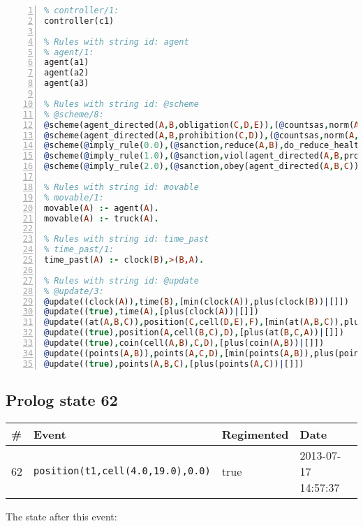 \documentclass[11pt]{article}\usepackage[utf8]{inputenc}\usepackage{geometry}
\begin{document}
\begin{lstlisting}[language=Prolog, numbers=left]
% Rules with string id: controller
% controller/1:
controller(c1)

% Rules with string id: agent
% agent/1:
agent(a1)
agent(a2)
agent(a3)

% Rules with string id: @scheme
% @scheme/8:
@scheme(agent_directed(A,B,obligation(C,D,E)),(@countsas,norm(A,B,F,obligation(C,D,E)),F),false,(listTrue(C)),(time_past(D)),false,[plus(viol(agent_directed(A,B,obligation(C,D,E))))|[]],[plus(obey(agent_directed(A,B,obligation(C,D,E))))|[]])
@scheme(agent_directed(A,B,prohibition(C,D)),(@countsas,norm(A,B,E,prohibition(C,D)),E),(listTrue(C)),false,(false),false,[plus(viol(agent_directed(A,B,prohibition(C,D))))|[]],[plus(obey(agent_directed(A,B,prohibition(C,D))))|[]])
@scheme(@imply_rule(0.0),(@sanction,reduce(A,B),do_reduce_health(A,B),notifyAgent(A,changed(status))),true,false,false,false,[min(reduce(A,B))|[]],[])
@scheme(@imply_rule(1.0),(@sanction,viol(agent_directed(A,B,prohibition(C,D))),do_sanction(D)),true,false,false,false,[min(viol(agent_directed(A,B,prohibition(C,D))))|[]],[])
@scheme(@imply_rule(2.0),(@sanction,obey(agent_directed(A,B,C))),true,false,false,false,[min(obey(agent_directed(A,B,C)))|[]],[])

% Rules with string id: movable
% movable/1:
movable(A) :- agent(A).
movable(A) :- truck(A).

% Rules with string id: time_past
% time_past/1:
time_past(A) :- clock(B),>(B,A).

% Rules with string id: @update
% @update/3:
@update((clock(A)),time(B),[min(clock(A)),plus(clock(B))|[]])
@update((true),time(A),[plus(clock(A))|[]])
@update((at(A,B,C)),position(C,cell(D,E),F),[min(at(A,B,C)),plus(at(D,E,C))|[]])
@update((true),position(A,cell(B,C),D),[plus(at(B,C,A))|[]])
@update((true),coin(cell(A,B),C,D),[plus(coin(A,B))|[]])
@update((points(A,B)),points(A,C,D),[min(points(A,B)),plus(points(A,D))|[]])
@update((true),points(A,B,C),[plus(points(A,C))|[]])

\end{lstlisting}
\clearpage 
\subsection{Prolog state 62}
\begin{table}[ht]
\centering 
\begin{tabular}{l l l l} 
\textbf{\#} & \textbf{Event} & \textbf{Regimented} & \textbf{Date} \\ [0.5ex] 
\hline
62&\texttt{position(t1,cell(4.0,19.0),0.0)}&true&2013-07-17 14:57:37\\ [1ex] \hline\end{tabular}
\end{table}
The state after this event:
\end{document}
